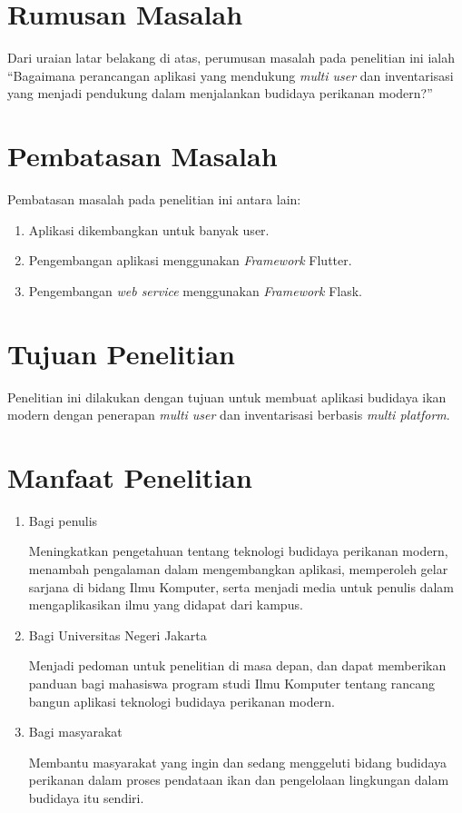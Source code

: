 \section{Rumusan Masalah}
Dari uraian latar belakang di atas, perumusan masalah pada penelitian ini ialah “Bagaimana perancangan aplikasi yang mendukung \emph{multi user} dan inventarisasi yang menjadi pendukung dalam menjalankan budidaya perikanan modern?”

\section{Pembatasan Masalah}
Pembatasan masalah pada penelitian ini antara lain:
\begin{enumerate}
	\item Aplikasi dikembangkan untuk banyak user.
	\item Pengembangan aplikasi menggunakan \emph{Framework} Flutter.
	\item Pengembangan \emph{web service} menggunakan \emph{Framework} Flask.
\end{enumerate}

\section{Tujuan Penelitian}
	Penelitian ini dilakukan dengan tujuan untuk membuat aplikasi budidaya ikan modern dengan penerapan \emph{multi user} dan inventarisasi berbasis \emph{multi platform}.

\section{Manfaat Penelitian}
\begin{enumerate}
	\item Bagi penulis
		
	Meningkatkan pengetahuan tentang teknologi budidaya perikanan modern, menambah pengalaman dalam mengembangkan aplikasi, memperoleh gelar sarjana di bidang Ilmu Komputer, serta menjadi media untuk penulis dalam mengaplikasikan ilmu yang didapat dari kampus.
		
	\item Bagi Universitas Negeri Jakarta
	 	
	Menjadi pedoman untuk penelitian di masa depan, dan dapat memberikan panduan bagi mahasiswa program studi Ilmu Komputer tentang rancang bangun aplikasi teknologi budidaya perikanan modern.
	
	\item Bagi masyarakat
	 	
	Membantu masyarakat yang ingin dan sedang menggeluti bidang budidaya perikanan dalam proses pendataan ikan dan pengelolaan lingkungan dalam budidaya itu sendiri.
	 			
\end{enumerate}

